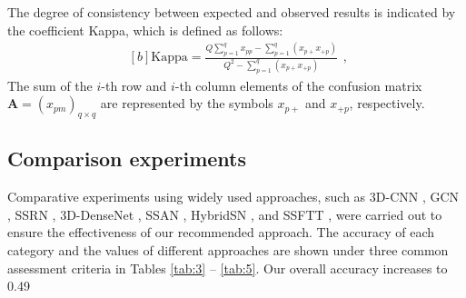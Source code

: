 \documentclass[]{interact}
\theoremstyle{plain}%
\theoremstyle{definition}
\theoremstyle{remark}
\begin{document}
The degree of consistency between expected and observed results is indicated by the coefficient Kappa, which is defined as follows:
\begin{equation}\label{eq:14}
\begin{aligned}[b]
\textrm{Kappa} =\frac{Q\sum_{p=1}^q x_{pp}-\sum_{p=1}^q (x_{p+} x_{+p})}{Q^{2}-\sum_{p=1}^q (x_{p+} x_{+p})} \end{aligned},
\end{equation}
The sum of the $i$-th row and $i$-th column elements of the confusion matrix $\bm A = (x_{pm})_{q \times q}$ are represented by the symbols $x_{p+}$  and $x_{+p}$, respectively.

\subsection{Comparison experiments}
Comparative experiments using widely used approaches, such as 3D-CNN \citep{2017Spectral}, GCN \citep{kipf2016semi}, SSRN \citep{Spectral}, 3D-DenseNet \citep{zhang2019three}, SSAN \citep{mei2019spectral}, HybridSN \citep{roy2019hybridsn}, and SSFTT \citep{2022Spectral}, were carried out to ensure the effectiveness of our recommended approach. The accuracy of each category and the values of different approaches are shown under three common assessment criteria in Tables \ref{tab:3} -- \ref{tab:5}. Our overall accuracy increases to 0.49%
\end{document}
